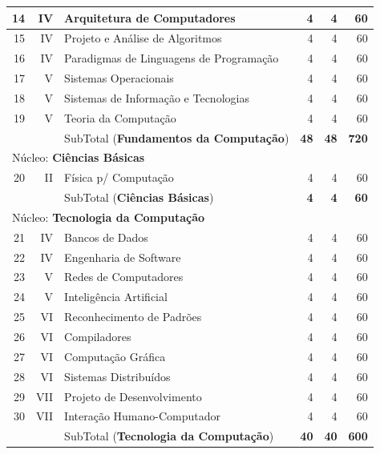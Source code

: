 \documentclass[
	12pt,				%
	openright,			%
  oneside,     %
	a4paper,			%
	english,			%
	french,				%
	spanish,			%
	brazil				%
	]{abntex2}
\begin{document}
\begin{apendicesenv}
\begin{longtable}{r|r|l|r|r|r}
    14    & IV    & Arquitetura de Computadores & 4     & 4     & 60 \\ \hline
    15    & IV    & Projeto e Análise de Algoritmos & 4     & 4     & 60 \\ \hline
    16    & IV    & Paradigmas de Linguagens de Programação & 4     & 4     & 60 \\ \hline
    17    & V     & Sistemas Operacionais & 4     & 4     & 60 \\ \hline
    18    & V     & Sistemas de Informação e Tecnologias & 4     & 4     & 60 \\ \hline
    19    & V     & Teoria da Computação & 4     & 4     & 60 \\ \hline
          &       & SubTotal (\textbf{Fundamentos da Computação}) & \textbf{48}    & \textbf{48}    & \textbf{720} \\ \hline
\multicolumn{6}{l}{Núcleo: \textbf{Ciências Básicas}} \\ \hline
    20    & II    & Física p/ Computação & 4     & 4     & 60 \\ \hline
          &       & SubTotal (\textbf{Ciências Básicas}) & \textbf{4}     & \textbf{4}     & \textbf{60} \\      \hline
\multicolumn{6}{l}{Núcleo: \textbf{Tecnologia da Computação}} \\         \hline 
    21    & IV    & Bancos de Dados & 4     & 4     & 60 \\     \hline
    22    & IV    & Engenharia de Software & 4     & 4     & 60 \\     \hline
    23    & V     & Redes de Computadores & 4     & 4     & 60 \\     \hline
    24    & V     & Inteligência Artificial & 4     & 4     & 60 \\ \hline 
    25    & VI    & Reconhecimento de Padrões & 4     & 4     & 60 \\     \hline
    26    & VI    & Compiladores & 4     & 4     & 60 \\     \hline
    27    & VI    & Computação Gráfica & 4     & 4     & 60 \\     \hline
    28    & VI    & Sistemas Distribuídos & 4     & 4     & 60 \\     \hline
    29    & VII   & Projeto de Desenvolvimento & 4     & 4     & 60 \\     \hline
    30    & VII   & Interação Humano-Computador & 4     & 4     & 60 \\    \hline
          &       & SubTotal (\textbf{Tecnologia da Computação}) & \textbf{40}    & \textbf{40}    & \textbf{600} \\          \hline

\end{longtable}
\end{apendicesenv}
\end{document}
